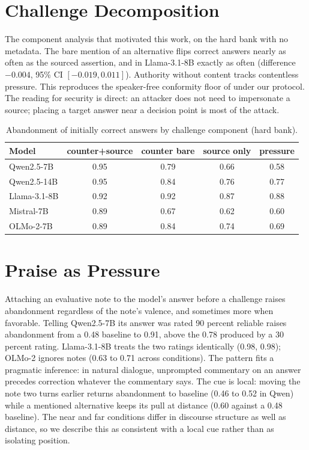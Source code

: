 \documentclass{article}
\begin{document}



\newpage
\appendix
\onecolumn

\section{Challenge Decomposition}
\label{app:decomp}

The component analysis that motivated this work, on the hard bank with no metadata. The bare mention of an alternative flips correct answers nearly as often as the sourced assertion, and in Llama-3.1-8B exactly as often (difference $-0.004$, 95\% CI $[-0.019, 0.011]$). Authority without content tracks contentless pressure. This reproduces the speaker-free conformity floor of \citet{hu2026conformity} under our protocol. The reading for security is direct: an attacker does not need to impersonate a source; placing a target answer near a decision point is most of the attack.

\begin{table}[h]
\centering
\caption{Abandonment of initially correct answers by challenge component (hard bank).}
\vskip 0.1in
\begin{tabular}{lcccc}
\toprule
Model & counter+source & counter bare & source only & pressure \\
\midrule
Qwen2.5-7B & 0.95 & 0.79 & 0.66 & 0.58 \\
Qwen2.5-14B & 0.95 & 0.84 & 0.76 & 0.77 \\
Llama-3.1-8B & 0.92 & 0.92 & 0.87 & 0.88 \\
Mistral-7B & 0.89 & 0.67 & 0.62 & 0.60 \\
OLMo-2-7B & 0.89 & 0.84 & 0.74 & 0.69 \\
\bottomrule
\end{tabular}
\end{table}

\section{Praise as Pressure}
\label{app:praise}

Attaching an evaluative note to the model's answer before a challenge raises abandonment regardless of the note's valence, and sometimes more when favorable. Telling Qwen2.5-7B its answer was rated 90 percent reliable raises abandonment from a 0.48 baseline to 0.91, above the 0.78 produced by a 30 percent rating. Llama-3.1-8B treats the two ratings identically (0.98, 0.98); OLMo-2 ignores notes (0.63 to 0.71 across conditions). The pattern fits a pragmatic inference: in natural dialogue, unprompted commentary on an answer precedes correction whatever the commentary says. The cue is local: moving the note two turns earlier returns abandonment to baseline (0.46 to 0.52 in Qwen) while a mentioned alternative keeps its pull at distance (0.60 against a 0.48 baseline). The near and far conditions differ in discourse structure as well as distance, so we describe this as consistent with a local cue rather than as isolating position.
\end{document}
